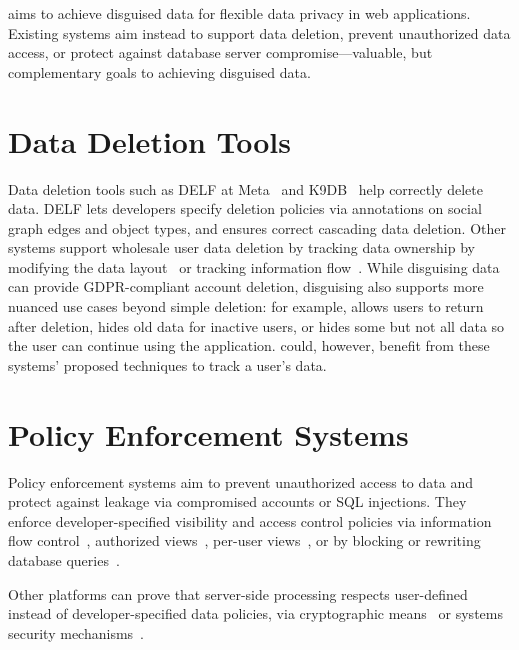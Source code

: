 \sys aims to achieve disguised data for flexible data privacy in web applications.
%
Existing systems aim instead to support data deletion, prevent unauthorized data
access, or protect against database server compromise---valuable, but
complementary goals to achieving disguised data.%

\section{Data Deletion Tools}
Data deletion tools such as DELF at
Meta~\cite{delf} and K9DB~\cite{k9db} help correctly delete data.
%
DELF lets developers specify deletion policies via annotations on
social graph edges and object types, and ensures correct cascading data
deletion.
%
Other systems support wholesale user data deletion by tracking
data ownership by modifying the data layout~\cite{usershards, k9db} or
tracking information flow~\cite{schengendb}.
%
While disguising data can provide GDPR-compliant account deletion, disguising
also supports more nuanced use cases beyond simple deletion: for example, \sys
allows users to return after deletion, hides old data for inactive users, or
hides some but not all data so the user can continue using the application.
%
\sys could, however, benefit from these systems' proposed techniques to track a
user's data.
%

\section{Policy Enforcement Systems}
Policy enforcement systems 
aim to prevent unauthorized access to data and protect against leakage via
compromised accounts or SQL injections.  They enforce developer-specified
visibility and access control policies via information flow
control~\cite{static, jeeves, jif, hails, ifdb}, authorized views~\cite{oracle},
per-user views~\cite{multiverse}, or by blocking or rewriting database
queries~\cite{blockaid, qapla, sieve}.

Other platforms can prove that server-side processing respects
user-defined instead of developer-specified data policies, via cryptographic means~\cite{zeph} or
systems security mechanisms~\cite{riverbed}.
%

